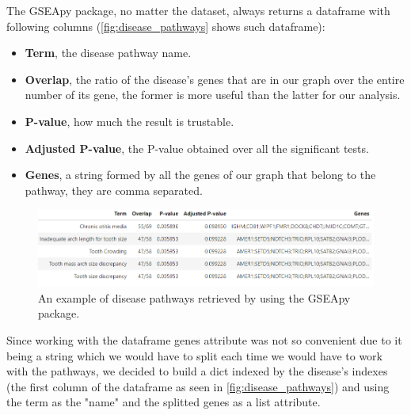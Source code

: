 The GSEApy package, no matter the dataset, always returns a dataframe with following columns (\autoref{fig:disease_pathways} shows such dataframe):
\begin{itemize}
    \item \textbf{Term}, the disease pathway name.
    \item \textbf{Overlap}, the ratio of the disease's genes that are in our graph over the entire number of its gene, the former is more useful than the latter for our analysis.
    \item \textbf{P-value}, how much the result is trustable.
    \item \textbf{Adjusted P-value}, the P-value obtained over all the significant tests.
    \item \textbf{Genes}, a string formed by all the genes of our graph that belong to the pathway, they are comma separated.
\end{itemize}
\begin{figure}[H]
    \centering
    \includegraphics[width=1\linewidth]{images/disease_pathways.png}
    \caption{An example of disease pathways retrieved by using the GSEApy package.}
    \label{fig:disease_pathways}
\end{figure}
Since working with the dataframe genes attribute was not so convenient due to it being a string which we would have to split each time we would have to work with the pathways, we decided to build a dict indexed by the disease's indexes (the first column of the dataframe as seen in \autoref{fig:disease_pathways}) and using the term as the "name" and the splitted genes as a list attribute.